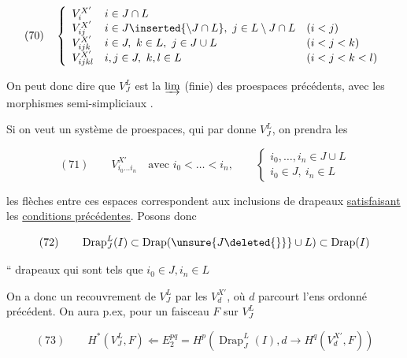 
\[
(70)\quad\left\{\begin{array}{lll}
V_i^{X'}&i\in J\cap L&\\
V_{ij}^{X'}&i\in J\inserted{\setminus J\cap L},\ j\in L\setminus J\cap L&(i<j)\\
V_{ijk}^{X'}&i\in J,\ k\in L,\ j\in J\cup L&(i<j<k)\\
V_{ijkl}^{X'}&i,j\in J,\ k,l\in L&(i<j<k<l)
\end{array}\right.
\]


On peut donc dire que $V_J^L$ est la $\varinjlim$ (finie) des proespaces précédents, avec  les morphismes semi-simpliciaux  .

Si on veut un système  de proespaces,  qui par  \inserted{$\unsure{\varinjlim|\underline{\lim}}$} donne $V_J^L$, on prendra les

\[
(71)\qquad V_{i_0\ldots i_n}^{X'}\quad\text{avec }i_0<\ldots<i_n,\qquad
\left\{\begin{array}{l}
i_0,\ldots,i_n\in J\cup L\\
i_0\in J,\ i_n\in L
\end{array}\right.
\]

les flèches entre ces espaces correspondent aux inclusions de drapeaux \uline{satisfaisant} les \uline{conditions précédentes}. Posons donc

\[
(72)\qquad\operatorname{Drap}_J^L(I)\subset\operatorname{Drap}(\unsure{J\deleted{\}}}\cup L)\subset\operatorname{Drap}(I)
\]

`` drapeaux  qui sont tels que $i_0\in J,i_n\in L$

On a donc un recouvrement de $V_J^L$ par les $V_d^{X'}$, où $d$ parcourt l'ens ordonné précédent. On aura p.ex, pour un faisceau $F$ sur $V_J^L$

\[
(73)\qquad H^*(V_J^L,F)\Longleftarrow E_2^{pq}=H^p(\operatorname{Drap}_J^L(I),d\to H^q(V_d^{X'},F))
\]

